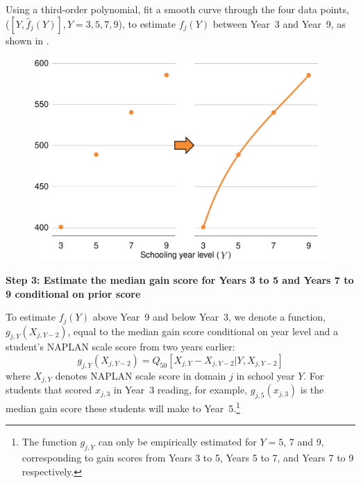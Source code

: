Using a third-order polynomial, fit a smooth curve through the four data points, ($[Y,\widehat{f}_{j}(Y)], Y = 3,5,7,9$), to estimate $f_{j}(Y)$ between \mbox{Year 3} and \mbox{Year 9}, as shown in .

\begin{figure}[H]
 \includegraphics[width=\columnwidth]{atlas/Interpolation.pdf}\label{fig:interpolation}

\end{figure}
\vspace{-6pt}

\textbf{Step 3: Estimate the median gain score for Years 3 to 5 and Years 7 to 9 conditional on prior score} 
\nopagebreak

To estimate $f_{j}(Y)$ above \mbox{Year 9} and below \mbox{Year 3}, we denote a function, $g_{j,Y}\left(X_{j,Y-2} \right)$, equal to the median gain score conditional on year level and a student's NAPLAN scale score from two years earlier:
\begin{equation}
g_{j,Y}\left(X_{j,Y-2} \right) = Q_{50}\left[X_{j,Y}-X_{j,Y-2} | Y, X_{j,Y-2} \right] \label{eq:med_gain}
\end{equation}
where $X_{j,Y}$ denotes NAPLAN scale score in domain $j$ in school year $Y$. For students that scored $x_{j,3}$ in \mbox{Year 3} reading, for example, $g_{j,5}(x_{j,3})$ is the median gain score these students will make to \mbox{Year 5}.\footnote{The function $g_{j,Y}$ can only be empirically estimated for $Y=5$, $7$ and $9$, corresponding to gain scores from Years 3 to 5, Years 5 to 7, and Years 7 to 9 respectively.}   

